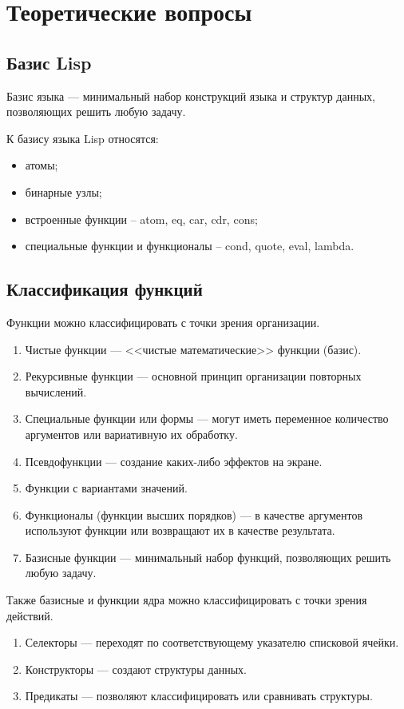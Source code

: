 \documentclass[14pt,a4paper]{scrreprt}
\begin{document}


\thispagestyle{empty}

\chapter{Теоретические вопросы}

\section{Базис Lisp}

Базис языка --- минимальный набор конструкций языка и структур данных, позволяющих решить любую задачу.

К базису языка Lisp относятся:
\begin{itemize}
	\item атомы;
	\item бинарные узлы;
	\item встроенные функции --  atom, eq, car, cdr, cons;
	\item специальные функции и функционалы -- cond, quote, eval, lambda.
\end{itemize}

\section{Классификация функций}

Функции можно классифицировать с точки зрения организации.
\begin{enumerate}
	\item Чистые функции --- <<чистые математические>> функции (базис).
	\item Рекурсивные функции --- основной принцип организации повторных вычислений.
	\item Специальные функции или формы --- могут иметь переменное количество аргументов или вариативную их обработку.
	\item Псевдофункции --- создание каких-либо эффектов на экране.
	\item Функции с вариантами значений.
	\item Функционалы (функции высших порядков) --- в качестве аргументов используют функции или возвращают их в качестве результата.
	\item Базисные функции --- минимальный набор функций, позволяющих решить любую задачу.
\end{enumerate}

Также базисные и функции ядра можно классифицировать с точки зрения действий.
\begin{enumerate}
	\item Селекторы --- переходят по соответствующему указателю списковой ячейки.
	\item Конструкторы --- создают структуры данных.
	\item Предикаты --- позволяют классифицировать или сравнивать структуры.
\end{enumerate}
\end{document}

